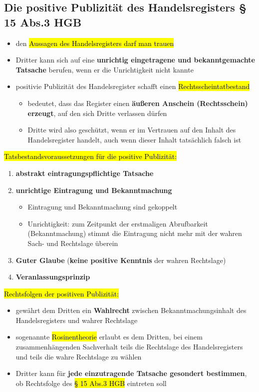 \documentclass[a4paper, 10pt]{article}
\begin{document}
\subsection{Die positive Publizität des Handelsregisters § 15 Abs.3 HGB}
\begin{itemize}
    \item den \hl{Aussagen des Handelsregisters darf man trauen}
    \item Dritter kann sich auf eine \textbf{unrichtig eingetragene und bekanntgemachte Tatsache} berufen, wenn er die Unrichtigkeit nicht kannte
    \item positivie Publizität des Handelsregister schafft einen \hl{Rechtsscheintatbestand} 
    \begin{itemize}
        \item bedeutet, dass das Register einen \textbf{äußeren Anschein (Rechtsschein) erzeugt}, auf den sich Dritte verlassen dürfen
        \item Dritte wird also geschützt, wenn er im Vertrauen auf den Inhalt des Handelsregister handelt, auch wenn dieser Inhalt tatsächlich falsch ist 
    \end{itemize}
\end {itemize}
\hl{Tatsbestandsvoraussetzungen für die positive Publizität:}
\begin{enumerate}
    \item \textbf{abstrakt eintragungspflichtige Tatsache}
    \item \textbf{unrichtige Eintragung und Bekanntmachung}
    \begin{itemize}
        \item Eintragung und Bekanntmachung sind gekoppelt
        \item Unrichtigkeit: zum Zeitpunkt der erstmaligen Abrufbarkeit (Bekanntmachung) stimmt die Eintragung nicht mehr mit der wahren Sach- und Rechtslage überein
    \end{itemize}

    \item \textbf{Guter Glaube} (\textbf{keine positive Kenntnis} der wahren Rechtslage)
    \item \textbf{Veranlassungsprinzip}
\end{enumerate}

\hl{Rechtsfolgen der positiven Publizität:}
\begin{itemize}
    \item gewährt dem Dritten ein \textbf{Wahlrecht} zwischen Bekanntmachungsinhalt des Handelsregisters und wahrer Rechtslage
    \item sogenannte \hl{Rosinentheorie} erlaubt es dem Dritten, bei einem zusammenhängenden Sachverhalt teils die Rechtslage des Handelsregisters und teils die wahre Rechtslage zu wählen
    \item Dritter kann für \textbf{jede einzutragende Tatsache gesondert bestimmen}, ob Rechtsfolge des \hl{§ 15 Abs.3 HGB} eintreten soll 
\end{itemize}
\end{document}
